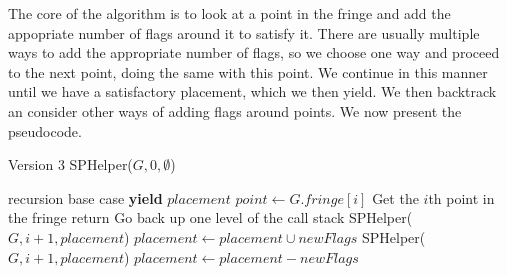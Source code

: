 \documentclass{article}
\theoremstyle{definition}
\theoremstyle{definition}
\theoremstyle{theorem}
\begin{document}
	The core of the algorithm is to look at a point in the fringe and add the appopriate number of flags around it to satisfy it. There are usually multiple ways to add the appropriate number of flags, so we choose one  way and proceed to the next point, doing the same with this point. We continue in this manner until we have a satisfactory placement, which we then yield. We then backtrack an consider other ways of adding flags around points. We now present the pseudocode.
	
	\begin{algorithmic}
		 \Comment Version 3
		\State SPHelper($G,0, \emptyset$)
		\EndFunction
		
		 \Comment recursion base case
		\State \textbf{yield} $placement$
		\EndIf
		\State $point \gets G.fringe[i]$ \Comment Get the $i$th point in the fringe
		\State return \Comment Go back up one level of the call stack
		\State SPHelper($G, i+1, placement$)
		\Else
		\State $placement \gets placement \cup newFlags$
		\State SPHelper($G, i+1, placement$)
		\State $placement \gets placement - newFlags$
		\EndFor
		\EndIf
		
		\EndFunction
	\end{algorithmic}
\end{document}
